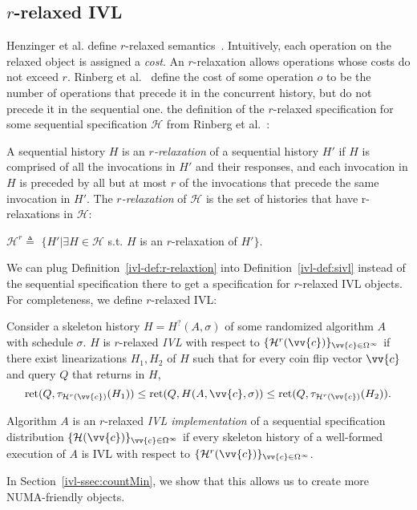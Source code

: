 
\subsection{\texorpdfstring{$r$}{r}-relaxed IVL}
\label{ivl-ssec:relaxed-cm}

Henzinger et al. define $r$-relaxed semantics~\cite{Henzinger}.
Intuitively, each operation on the relaxed object is assigned a \emph{cost}. An
$r$-relaxation allows operations whose costs do not exceed $r$. Rinberg et al.~\cite{rinberg2019fast}
define the cost of some operation $o$ to be the number of operations that precede it in the
concurrent history, but do not precede it in the sequential one.
 the definition of the $r$-relaxed
specification for some sequential specification $\mathcal{H}$ from Rinberg et al.~\cite{rinberg2019fast}:
\begin{definition}[r-relaxation]
    A sequential history $H$ is an \emph{$r$-relaxation} of a sequential history $H'$
    if $H$ is comprised of all the invocations in $H'$ and their responses,
    and each invocation in $H$ is preceded by all but at most $r$ of the invocations that precede the 
    same invocation in $H'$. The \emph{$r$-relaxation} of $\mathcal{H}$ is the set of histories
    that have r-relaxations in $\mathcal{H}$:
    
    $\mathcal{H}^r \triangleq $ $\{H'|\exists H\in$$\mathcal{H}$ s.t. $H$ is an $r$-relaxation of $H'\}$.
    \label{ivl-def:r-relaxtion}
\end{definition}
We can plug Definition~\ref{ivl-def:r-relaxtion} into Definition~\ref{ivl-def:sivl} instead
of the sequential specification there to get a specification for $r$-relaxed IVL objects.
For completeness, we define $r$-relaxed IVL:
\begin{definition}
  Consider a skeleton history $H=H^?(A, \sigma)$ of some
  randomized algorithm $A$ with schedule $\sigma$.
  $H$ is $r$-relaxed \emph{IVL} with respect to $\{\mathcal{H}^r(\vv{c})\}_{\vv{c} \in \Omega^\infty}$ if there exist
  linearizations $H_1, H_2$ of $H$ such that for every coin flip vector $\vv{c}$ and query $Q$
  that returns in $H$,
  \[\text{ret}(Q, \tau_{\mathcal{H}^r(\vv{c})}(H_1)) \leq \text{ret}(Q, H(A, \vv{c}, \sigma)) \leq \text{ret}(Q, \tau_{\mathcal{H}^r(\vv{c})}(H_2)). \]

  Algorithm $A$ is an $r$-relaxed \emph{IVL implementation} of a sequential specification
  distribution $\{\mathcal{H}(\vv{c})\}_{\vv{c} \in \Omega^\infty}$ if every skeleton
  history of a well-formed execution of $A$ is IVL with
  respect to $\{\mathcal{H}^r(\vv{c})\}_{\vv{c} \in \Omega^\infty}$.
  \label{ivl-def:relaxed-sivl}
\end{definition}
 In Section~\ref{ivl-ssec:countMin}, we show that this allows us to create more NUMA-friendly objects.



